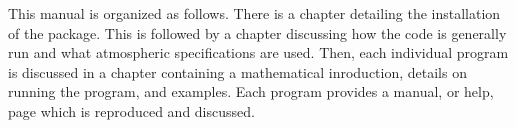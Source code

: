 This manual is organized as follows. There is a chapter detailing the installation of the package. This is followed by a chapter discussing how the code is generally run and what atmospheric specifications are used. Then, each individual program is discussed in a chapter containing a mathematical inroduction, details on running the program, and examples. Each program provides a manual, or help, page which is reproduced and discussed. 
